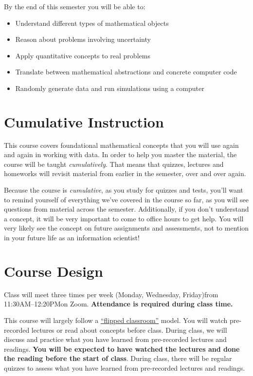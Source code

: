 \documentclass[10pt]{memoir}
\def\mymeetingdays{Monday, Wednesday, Friday}
\def\mymeetingtimes{11:30AM--12:20PM}
\begin{document}
By the end of this semester you will be able to:
\begin{itemize}
\item Understand different types of mathematical objects
\item Reason about problems involving uncertainty
\item Apply quantitative concepts to real problems
\item Translate between mathematical abstractions and concrete computer code
\item Randomly generate data and run simulations using a computer
\end{itemize}

\section{\textbf{Cumulative Instruction}}

This course covers foundational mathematical concepts that you will use again and again in working with data. In order to help you master the material, the course will be taught \textit{cumulatively}. That means that quizzes, lectures and homeworks will revisit material from earlier in the semester, over and over again. 

Because the course is \textit{cumulative}, as you study for quizzes and tests, you'll want to remind yourself of everything we've covered in the course so far, as you will see questions from material across the semester. Additionally, if you don't understand a concept, it will be very important to come to office hours to get help. You will very likely see the concept on future assignments and assessments, not to mention in your future life as an information scientist!

\section{\textbf{Course Design}}
Class will meet three times per week (\mymeetingdays)\space from \mymeetingtimes\space on Zoom. \textbf{Attendance is required during class time.} 

This course will largely follow a \href{https://en.wikipedia.org/wiki/Flipped_classroom}{``flipped classroom''}  model. You will watch pre-recorded lectures or read about concepts before class. During class, we will discuss and practice what you have learned from pre-recorded lectures and readings. \textbf{You will be expected to have watched the lectures and done the reading before the start of class}. During class, there will be regular quizzes to assess what you have learned from pre-recorded lectures and readings. 
\end{document}
